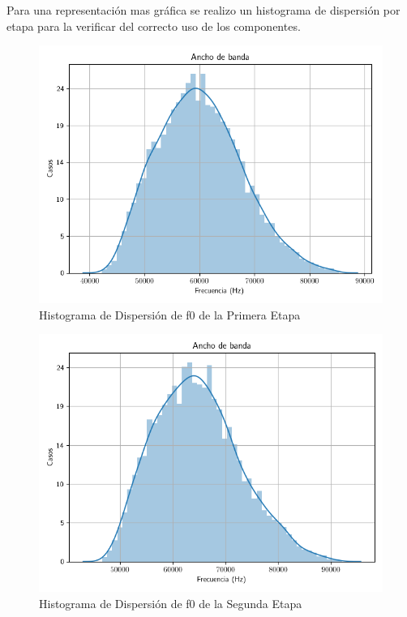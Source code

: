 Para una representación mas gráfica se realizo un histograma de dispersión por etapa para la verificar del correcto uso de los componentes.

\begin{figure}[H]
    \centering
    \includegraphics[scale = 0.5]{disp1.png}
    \caption{Histograma de Dispersión de f0 de la Primera Etapa}
    \label{ej22dis1}
\end{figure}

\begin{figure}[H]
    \centering
    \includegraphics[scale = 0.5]{disp2.png}
    \caption{Histograma de Dispersión de f0 de la Segunda Etapa}
    \label{ej22dis1}
\end{figure}


